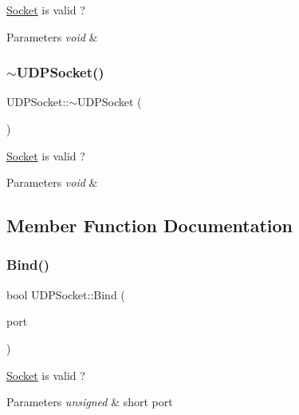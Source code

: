 \hyperlink{class_socket}{Socket} is valid ? 


\begin{DoxyParams}{Parameters}
{\em void} & \\
\hline
\end{DoxyParams}
\mbox{\label{class_u_d_p_socket_adb1a5254938e5acf5d44ff7a347e9f0a}} 
\subsubsection{\texorpdfstring{$\sim$\+U\+D\+P\+Socket()}{~UDPSocket()}}
{\footnotesize\ttfamily U\+D\+P\+Socket\+::$\sim$\+U\+D\+P\+Socket (\begin{DoxyParamCaption}{ }\end{DoxyParamCaption})}



\hyperlink{class_socket}{Socket} is valid ? 


\begin{DoxyParams}{Parameters}
{\em void} & \\
\hline
\end{DoxyParams}


\subsection{Member Function Documentation}
\mbox{\label{class_u_d_p_socket_afaaa0a469391a9f9ca9e7cf072f064b6}} 
\subsubsection{\texorpdfstring{Bind()}{Bind()}}
{\footnotesize\ttfamily bool U\+D\+P\+Socket\+::\+Bind (\begin{DoxyParamCaption}\item[{unsigned short}]{port }\end{DoxyParamCaption})}



\hyperlink{class_socket}{Socket} is valid ? 


\begin{DoxyParams}{Parameters}
{\em unsigned} & short port \\
\hline
\end{DoxyParams}
\mbox{\label{class_u_d_p_socket_a54eb0e16443ae0cab6a7bbc3d5ac4c5f}} 
